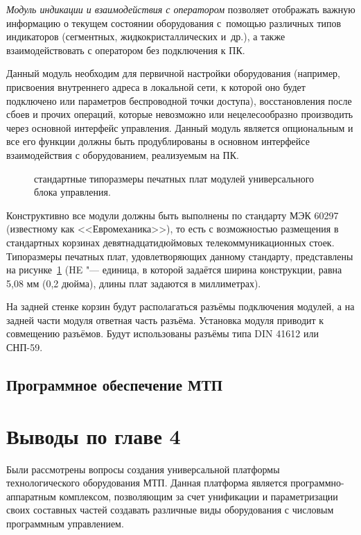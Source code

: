 \textit{Модуль индикации и взаимодействия с оператором} позволяет отображать важную информацию о текущем состоянии оборудования с~помощью различных типов индикаторов (сегментных, жидкокристаллических и~др.), а также взаимодействовать с оператором без подключения к ПК.

Данный модуль необходим для первичной настройки оборудования (например, присвоения внутреннего адреса в локальной сети, к которой оно будет подключено или параметров беспроводной точки доступа), восстановления после сбоев и прочих операций, которые невозможно или нецелесообразно производить через основной интерфейс управления. Данный модуль является опциональным и все его функции должны быть продублированы в основном интерфейсе взаимодействия с оборудованием, реализуемым на ПК.

\begin{figure}[ht]
	\caption{стандартные типоразмеры печатных плат модулей универсального блока управления.}\label{fig:euromech}
\end{figure}

Конструктивно все модули должны быть выполнены по стандарту МЭК 60297 (известному как <<Евромеханика>>), то есть с возможностью размещения в стандартных корзинах девятнадцатидюймовых телекоммуникационных стоек. Типоразмеры печатных плат, удовлетворяющих данному стандарту, представлены на рисунке~\cref{fig:euromech} (\foreignlanguage{english}{HE} "--- единица, в которой задаётся ширина конструкции, равна 5,08 мм (0,2 дюйма), длины плат задаются в миллиметрах).

На задней стенке корзин будут располагаться разъёмы подключения модулей, а на задней части модуля ответная часть разъёма. Установка модуля приводит к совмещению разъёмов. Будут использованы разъёмы типа DIN 41612 или СНП-59.

\subsection{Программное обеспечение МТП}


\section{Выводы по главе 4}

Были рассмотрены вопросы создания универсальной платформы технологического оборудования МТП. Данная платформа является программно-аппаратным комплексом, позволяющим за счет унификации и параметризации своих составных частей создавать различные виды оборудования с числовым программным управлением.

